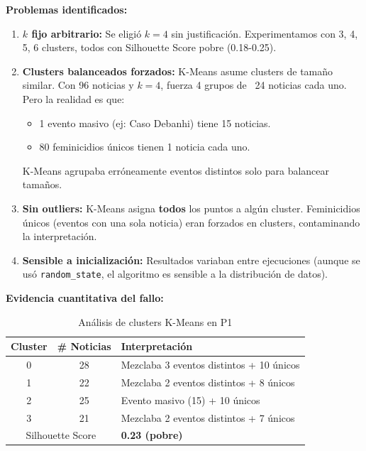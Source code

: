 \textbf{Problemas identificados:}

\begin{enumerate}
    \item \textbf{$k$ fijo arbitrario:} Se eligió $k=4$ sin justificación. Experimentamos con 3, 4, 5, 6 clusters, todos con Silhouette Score pobre (0.18-0.25).
    
    \item \textbf{Clusters balanceados forzados:} K-Means asume clusters de tamaño similar. Con 96 noticias y $k=4$, fuerza 4 grupos de ~24 noticias cada uno. Pero la realidad es que:
    \begin{itemize}
        \item 1 evento masivo (ej: Caso Debanhi) tiene 15 noticias.
        \item 80 feminicidios únicos tienen 1 noticia cada uno.
    \end{itemize}
    K-Means agrupaba erróneamente eventos distintos solo para balancear tamaños.
    
    \item \textbf{Sin outliers:} K-Means asigna \textbf{todos} los puntos a algún cluster. Feminicidios únicos (eventos con una sola noticia) eran forzados en clusters, contaminando la interpretación.
    
    \item \textbf{Sensible a inicialización:} Resultados variaban entre ejecuciones (aunque se usó \texttt{random\_state}, el algoritmo es sensible a la distribución de datos).
\end{enumerate}

\textbf{Evidencia cuantitativa del fallo:}

\begin{table}[h]
\centering
\caption{Análisis de clusters K-Means en P1}
\begin{tabular}{|c|c|l|}
\hline
\textbf{Cluster} & \textbf{\# Noticias} & \textbf{Interpretación} \\ \hline
0 & 28 & Mezclaba 3 eventos distintos + 10 únicos \\ \hline
1 & 22 & Mezclaba 2 eventos distintos + 8 únicos \\ \hline
2 & 25 & Evento masivo (15) + 10 únicos \\ \hline
3 & 21 & Mezclaba 2 eventos distintos + 7 únicos \\ \hline
\multicolumn{2}{|c|}{Silhouette Score} & \textbf{0.23 (pobre)} \\ \hline
\end{tabular}
\end{table}

